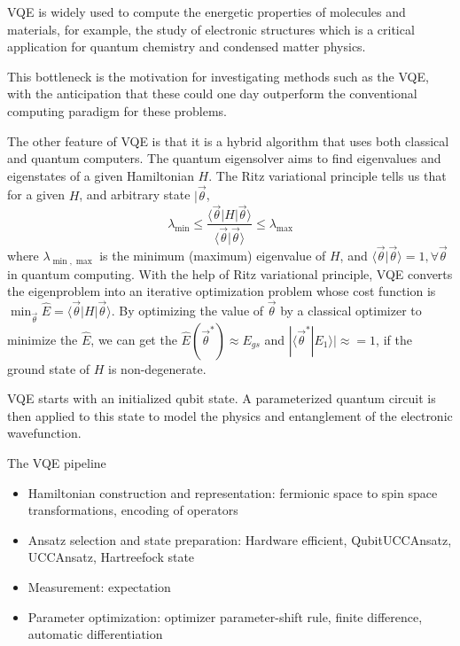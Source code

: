 VQE is widely used to compute the energetic properties of molecules and materials, for example, the study of electronic structures which is a critical application for quantum chemistry and condensed matter physics.

This bottleneck is the motivation for investigating methods such as the VQE, with the anticipation that these could one day outperform the conventional computing paradigm for these problems.


The other feature of VQE is that it is a hybrid algorithm that uses both classical and quantum computers.
The quantum eigensolver aims to find eigenvalues and eigenstates of a given Hamiltonian $H$.
The Ritz variational principle tells us that for a given $H$, and arbitrary state $|\vec{\theta}$,
\begin{equation}
    \lambda_{\min}\leq \frac{\langle \vec{\theta} |H| \vec{\theta}\rangle}{\langle \vec{\theta}|\vec{\theta}\rangle} \leq \lambda_{\max}
\end{equation}
where $\lambda_{\min, \max}$ is the minimum (maximum) eigenvalue of $H$, and $\langle \vec{\theta}|\vec{\theta}\rangle = 1, \forall \vec{\theta}$ in quantum computing.
With the help of Ritz variational principle, VQE converts the eigenproblem into an iterative optimization problem whose cost function is $\min_{\vec{\theta}}\hat{E}= \langle \vec{\theta} |H| \vec{\theta}\rangle$.
By optimizing the value of $\vec{\theta}$ by a classical optimizer to minimize the $\hat{E}$, we can get the $\hat{E}(\vec{\theta}^*)\approx E_{gs}$ and $|\langle \vec{\theta}^*|E_1\rangle| \approx = 1$, if the ground state of $H$ is non-degenerate.

VQE starts with an initialized qubit state. A parameterized quantum circuit is then applied to this state to model the physics and entanglement of the electronic wavefunction.

The VQE pipeline
\begin{itemize}
    \item Hamiltonian construction and representation: fermionic space to spin space transformations, encoding of operators
    \item Ansatz selection and state preparation: Hardware efficient, QubitUCCAnsatz, UCCAnsatz, Hartreefock state
    \item Measurement: expectation
    \item Parameter optimization: optimizer parameter-shift rule, finite difference, automatic differentiation
\end{itemize}


